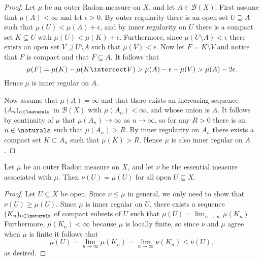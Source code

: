 \documentclass[article, a4paper, 11pt, oneside]{memoir}
\numberwithin{equation}{chapter}
\newcommand{\calB}{\mathcal{B}}
\newcommand{\borel}[1]{\calB(#1)}
\begin{document}
\begin{proof}
    Let $\mu$ be an outer Radon measure on $X$, and let $A \in \borel{X}$. First assume that $\mu(A) < \infty$ and let $\epsilon > 0$. By outer regularity there is an open set $U \supseteq A$ such that $\mu(U) < \mu(A) + \epsilon$, and by inner regularity on $U$ there is a compact set $K \subseteq U$ with $\mu(U) < \mu(K) + \epsilon$. Furthermore, since $\mu(U \setminus A) < \epsilon$ there exists an open set $V \supseteq U \setminus A$ such that $\mu(V) < \epsilon$. Now let $F = K \setminus V$ and notice that $F$ is compact and that $F \subseteq A$. It follows that
    \begin{equation*}
        \mu(F)
            = \mu(K) - \mu(K \intersect V)
            > \mu(A) - \epsilon - \mu(V)
            > \mu(A) - 2\epsilon.
    \end{equation*}
    Hence $\mu$ is inner regular on $A$.

    Now assume that $\mu(A) = \infty$ and that there exists an increasing sequence $(A_n)_{n \in \naturals}$ in $\borel{X}$ with $\mu(A_n) < \infty$, and whose union is $A$. It follows by continuity of $\mu$ that $\mu(A_n) \to \infty$ as $n \to \infty$, so for any $R > 0$ there is an $n \in \naturals$ such that $\mu(A_n) > R$. By inner regularity on $A_n$ there exists a compact set $K \subset A_n$ such that $\mu(K) > R$. Hence $\mu$ is also inner regular on $A$.
\end{proof}

\begin{lemma}
    \label{thm:Radon-agree-on-open-sets}
    Let $\mu$ be an outer Radon measure on $X$, and let $\nu$ be the essential measure associated with $\mu$. Then $\nu(U) = \mu(U)$ for all open $U \subseteq X$.
\end{lemma}

\begin{proof}
    Let $U \subseteq X$ be open. Since $\nu \leq \mu$ in general, we only need to show that $\nu(U) \geq \mu(U)$. Since $\mu$ is inner regular on $U$, there exists a sequence $(K_n)_{n \in \naturals}$ of compact subsets of $U$ such that $\mu(U) = \lim_{n \to \infty} \mu(K_n)$. Furthermore, $\mu(K_n) < \infty$ because $\mu$ is locally finite, so since $\nu$ and $\mu$ agree when $\mu$ is finite it follows that
    \begin{equation*}
        \mu(U)
            = \lim_{n \to \infty} \mu(K_n)
            = \lim_{n \to \infty} \nu(K_n)
            \leq \nu(U),
    \end{equation*}
    as desired.
\end{proof}
\end{document}
